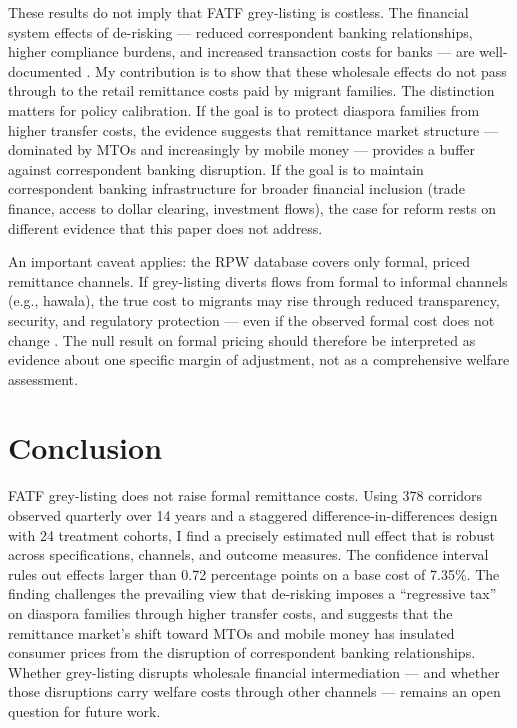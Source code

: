 \documentclass[12pt]{article}
\begin{document}
These results do not imply that FATF grey-listing is costless. The financial system effects of de-risking --- reduced correspondent banking relationships, higher compliance burdens, and increased transaction costs for banks --- are well-documented \citep{fsb2018, imf2021wps, erbenova2016}. My contribution is to show that these wholesale effects do not pass through to the retail remittance costs paid by migrant families. The distinction matters for policy calibration. If the goal is to protect diaspora families from higher transfer costs, the evidence suggests that remittance market structure --- dominated by MTOs and increasingly by mobile money --- provides a buffer against correspondent banking disruption. If the goal is to maintain correspondent banking infrastructure for broader financial inclusion (trade finance, access to dollar clearing, investment flows), the case for reform rests on different evidence that this paper does not address.

An important caveat applies: the RPW database covers only formal, priced remittance channels. If grey-listing diverts flows from formal to informal channels (e.g., hawala), the true cost to migrants may rise through reduced transparency, security, and regulatory protection --- even if the observed formal cost does not change \citep{freund2008}. The null result on formal pricing should therefore be interpreted as evidence about one specific margin of adjustment, not as a comprehensive welfare assessment.


\section{Conclusion}

FATF grey-listing does not raise formal remittance costs. Using 378 corridors observed quarterly over 14 years and a staggered difference-in-differences design with 24 treatment cohorts, I find a precisely estimated null effect that is robust across specifications, channels, and outcome measures. The confidence interval rules out effects larger than 0.72 percentage points on a base cost of 7.35\%. The finding challenges the prevailing view that de-risking imposes a ``regressive tax'' on diaspora families through higher transfer costs, and suggests that the remittance market's shift toward MTOs and mobile money has insulated consumer prices from the disruption of correspondent banking relationships. Whether grey-listing disrupts wholesale financial intermediation --- and whether those disruptions carry welfare costs through other channels --- remains an open question for future work.
\end{document}
